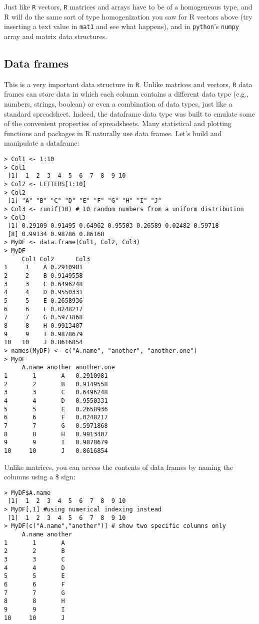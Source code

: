 Just like {\tt R} vectors, {\tt R} matrices and arrays have to be of a 
homogeneous type, and R will do the same sort of type homogenization 
you saw for R vectors above (try inserting a text value in {\tt mat1} and 
see what happens), and in {\tt python}'s {\tt numpy} array and matrix 
data structures. 

\subsection{Data frames}

This is a very important data structure in {\tt R}. Unlike matrices and 
vectors, {\tt R} data frames can store data in which each column 
contains a different data type (e.g., numbers, strings, boolean) or 
even a combination of data types, just like a standard spreadsheet. 
Indeed, the dataframe data type was built to emulate some of the 
convenient properties of spreadsheets. Many statistical and plotting 
functions and packages in R naturally use data frames. Let's build and 
manipulate a dataframe:
\begin{lstlisting}
> Col1 <- 1:10
> Col1
 [1]  1  2  3  4  5  6  7  8  9 10
> Col2 <- LETTERS[1:10]
> Col2
 [1] "A" "B" "C" "D" "E" "F" "G" "H" "I" "J"
> Col3 <- runif(10) # 10 random numbers from a uniform distribution
> Col3
 [1] 0.29109 0.91495 0.64962 0.95503 0.26589 0.02482 0.59718
 [8] 0.99134 0.98786 0.86168
> MyDF <- data.frame(Col1, Col2, Col3)
> MyDF
	 Col1 Col2      Col3
1     1    A 0.2910981
2     2    B 0.9149558
3     3    C 0.6496248
4     4    D 0.9550331
5     5    E 0.2658936
6     6    F 0.0248217
7     7    G 0.5971868
8     8    H 0.9913407
9     9    I 0.9878679
10   10    J 0.8616854
> names(MyDF) <- c("A.name", "another", "another.one")
> MyDF
	 A.name another another.one
1       1       A   0.2910981
2       2       B   0.9149558
3       3       C   0.6496248
4       4       D   0.9550331
5       5       E   0.2658936
6       6       F   0.0248217
7       7       G   0.5971868
8       8       H   0.9913407
9       9       I   0.9878679
10     10       J   0.8616854
\end{lstlisting}

Unlike matrices, you can access the contents of data frames by naming 
the columns using a \$ sign: 
\begin{lstlisting}
> MyDF$A.name
 [1]  1  2  3  4  5  6  7  8  9 10
> MyDF[,1] #using numerical indexing instead
 [1]  1  2  3  4  5  6  7  8  9 10
> MyDF[c("A.name","another")] # show two specific columns only
	 A.name another
1       1       A
2       2       B
3       3       C
4       4       D
5       5       E
6       6       F
7       7       G
8       8       H
9       9       I
10     10       J
\end{lstlisting}

